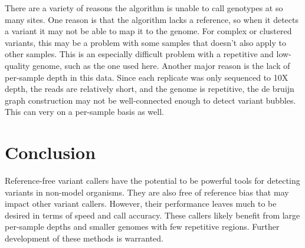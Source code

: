 \documentclass{article}
\begin{document}
\begin{outline}

	\item There are a variety of reasons the algorithm is unable to call genotypes at so many sites. One reason is that the algorithm lacks a reference, so when it detects a variant it may not be able to map it to the genome. For complex or clustered variants, this may be a problem with some samples that doesn't also apply to other samples. This is an especially difficult problem with a repetitive and low-quality genome, such as the one used here. Another major reason is the lack of per-sample depth in this data. Since each replicate was only sequenced to 10X depth, the reads are relatively short, and the genome is repetitive, the de bruijn graph construction may not be well-connected enough to detect variant bubbles. This can very on a per-sample basis as well.


\end{outline}

\section{Conclusion}
\begin{outline}
\item Reference-free variant callers have the potential to be powerful tools for detecting variants in non-model organisms. They are also free of reference bias that may impact other variant callers. However, their performance leaves much to be desired in terms of speed and call accuracy. These callers likely benefit from large per-sample depths and smaller genomes with few repetitive regions. Further development of these methods is warranted.
\end{outline}

\printbibliography
\end{document}

